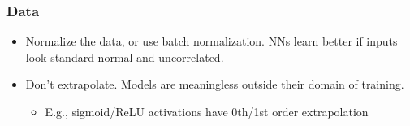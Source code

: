 \begin{frame}
    \frametitle{Data}

    \begin{itemize}
        \item<+-> \alert{Normalize the data, or use batch normalization.}
        NNs learn better if inputs look standard normal and uncorrelated.
        \item<+-> \alert{Don't extrapolate.}
        Models are meaningless outside their domain of training.
        \begin{itemize}
            \item E.g., sigmoid/ReLU activations have 0th/1st order extrapolation
        \end{itemize}
    \end{itemize}

    \begin{columns}
        \begin{column}{0.4\textwidth}
            \centering
            \footnotesize

        \end{column}

        \begin{column}{0.6\textwidth}
            \centering
            \footnotesize

            \setcounter{beamerpauses}{3}
        \end{column}
    \end{columns}
\end{frame}

